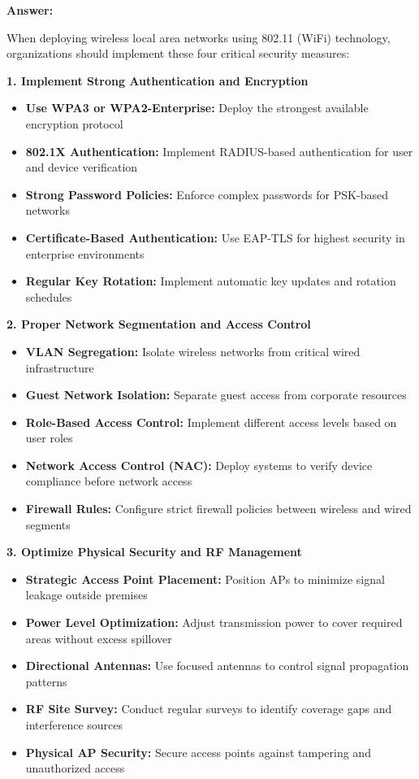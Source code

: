 \documentclass[12pt,a4paper]{article}
\begin{document}
\textbf{Answer:}

When deploying wireless local area networks using 802.11 (WiFi) technology, organizations should implement these four critical security measures:

\textbf{1. Implement Strong Authentication and Encryption}
\begin{itemize}
    \item \textbf{Use WPA3 or WPA2-Enterprise:} Deploy the strongest available encryption protocol
    \item \textbf{802.1X Authentication:} Implement RADIUS-based authentication for user and device verification
    \item \textbf{Strong Password Policies:} Enforce complex passwords for PSK-based networks
    \item \textbf{Certificate-Based Authentication:} Use EAP-TLS for highest security in enterprise environments
    \item \textbf{Regular Key Rotation:} Implement automatic key updates and rotation schedules
\end{itemize}

\textbf{2. Proper Network Segmentation and Access Control}
\begin{itemize}
    \item \textbf{VLAN Segregation:} Isolate wireless networks from critical wired infrastructure
    \item \textbf{Guest Network Isolation:} Separate guest access from corporate resources
    \item \textbf{Role-Based Access Control:} Implement different access levels based on user roles
    \item \textbf{Network Access Control (NAC):} Deploy systems to verify device compliance before network access
    \item \textbf{Firewall Rules:} Configure strict firewall policies between wireless and wired segments
\end{itemize}

\textbf{3. Optimize Physical Security and RF Management}
\begin{itemize}
    \item \textbf{Strategic Access Point Placement:} Position APs to minimize signal leakage outside premises
    \item \textbf{Power Level Optimization:} Adjust transmission power to cover required areas without excess spillover
    \item \textbf{Directional Antennas:} Use focused antennas to control signal propagation patterns
    \item \textbf{RF Site Survey:} Conduct regular surveys to identify coverage gaps and interference sources
    \item \textbf{Physical AP Security:} Secure access points against tampering and unauthorized access
\end{itemize}
\end{document}

